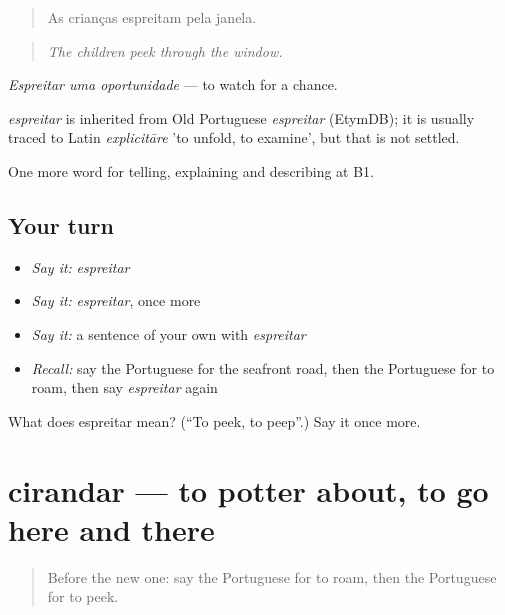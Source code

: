 \begin{quote}
As crianças espreitam pela janela.
\end{quote}

\begin{quote}
\emph{The children peek through the window.}
\end{quote}

\emph{Espreitar uma oportunidade} — to watch for a chance.

\begin{cousinweb}
\emph{espreitar} is inherited from Old Portuguese \emph{espreitar} (EtymDB); it is usually traced to Latin \emph{explicitāre} 'to unfold, to examine', but that is not settled.
\end{cousinweb}

\begin{grammarlens}[title={What you've built}]
One more word for telling, explaining and describing at B1.
\end{grammarlens}

\subsection*{Your turn}
\begin{itemize}
\raggedright
  \item \emph{Say it:} \emph{espreitar}
  \item \emph{Say it:} \emph{espreitar}, once more
  \item \emph{Say it:} a sentence of your own with \emph{espreitar}
  \item \emph{Recall:} say the Portuguese for the seafront road, then the Portuguese for to roam, then say \emph{espreitar} again
\end{itemize}

\begin{tcolorbox}[breakable,colback=teal!4,colframe=teal!35!black,title={Before you move on}]
What does espreitar mean? (\textquotedblleft{}To peek, to peep\textquotedblright{}.) Say it once more.
\end{tcolorbox}
\section[cirandar]{cirandar — to potter about, to go here and there}

\label{lesson:PT-C447-cirandar}



\begin{quote}
Before the new one: say the Portuguese for to roam, then the Portuguese for to peek.
\end{quote}

